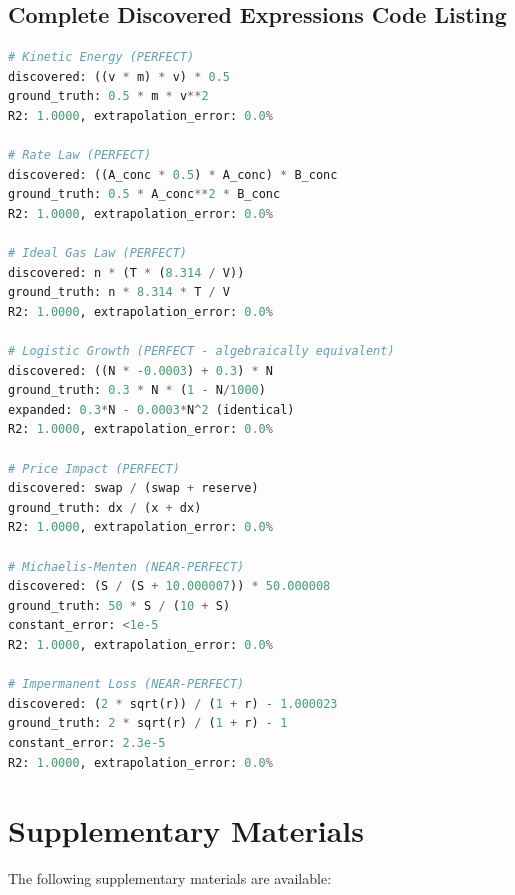 \documentclass[twoside,11pt]{article}
\begin{document}
\subsection{Complete Discovered Expressions Code Listing}

\begin{lstlisting}[caption=Discovered Symbolic Expressions (7 Perfect Recoveries), label=lst:discovered, language=Python]
# Kinetic Energy (PERFECT)
discovered: ((v * m) * v) * 0.5
ground_truth: 0.5 * m * v**2
R2: 1.0000, extrapolation_error: 0.0%

# Rate Law (PERFECT)
discovered: ((A_conc * 0.5) * A_conc) * B_conc  
ground_truth: 0.5 * A_conc**2 * B_conc
R2: 1.0000, extrapolation_error: 0.0%

# Ideal Gas Law (PERFECT)
discovered: n * (T * (8.314 / V))
ground_truth: n * 8.314 * T / V
R2: 1.0000, extrapolation_error: 0.0%

# Logistic Growth (PERFECT - algebraically equivalent)
discovered: ((N * -0.0003) + 0.3) * N
ground_truth: 0.3 * N * (1 - N/1000)
expanded: 0.3*N - 0.0003*N^2 (identical)
R2: 1.0000, extrapolation_error: 0.0%

# Price Impact (PERFECT)
discovered: swap / (swap + reserve)
ground_truth: dx / (x + dx)
R2: 1.0000, extrapolation_error: 0.0%

# Michaelis-Menten (NEAR-PERFECT)
discovered: (S / (S + 10.000007)) * 50.000008
ground_truth: 50 * S / (10 + S)
constant_error: <1e-5
R2: 1.0000, extrapolation_error: 0.0%

# Impermanent Loss (NEAR-PERFECT)
discovered: (2 * sqrt(r)) / (1 + r) - 1.000023
ground_truth: 2 * sqrt(r) / (1 + r) - 1
constant_error: 2.3e-5
R2: 1.0000, extrapolation_error: 0.0%
\end{lstlisting}



\section{Supplementary Materials}
\label{app:supplementary}

The following supplementary materials are available:
\end{document}
